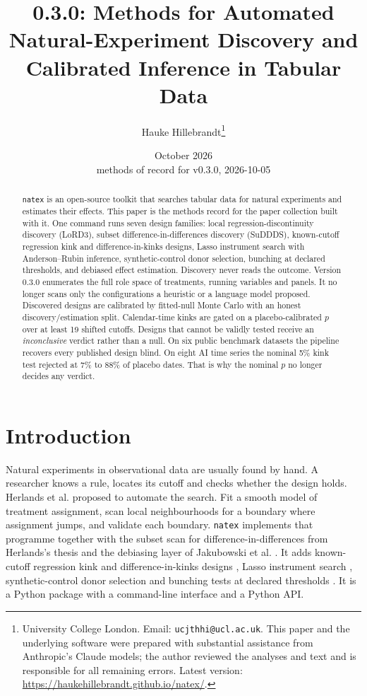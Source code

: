 \documentclass[11pt]{article}
\title{\natex{} 0.3.0: Methods for Automated Natural-Experiment Discovery and
Calibrated Inference in Tabular Data}
\author{Hauke Hillebrandt\thanks{University College London. Email:
\texttt{ucjthhi@ucl.ac.uk}. This paper and the underlying \natex{} software were
prepared with substantial assistance from Anthropic's Claude models; the author
reviewed the analyses and text and is responsible for all remaining errors.
Latest version: \url{https://haukehillebrandt.github.io/natex/}.}}
\date{October 2026 \\ \small methods of record for \natex{} v0.3.0, 2026-10-05}
\newcommand{\natex}{\texttt{natex}}
\begin{document}
\maketitle

\begin{abstract}
\noindent \natex{} is an open-source toolkit that searches tabular data for natural
experiments and estimates their effects. This paper is the methods record for the paper
collection built with it. One command runs seven design families: local
regression-discontinuity discovery (LoRD3), subset difference-in-differences discovery
(SuDDDS), known-cutoff regression kink and difference-in-kinks designs, Lasso instrument
search with Anderson--Rubin inference, synthetic-control donor selection, bunching at
declared thresholds, and debiased effect estimation. Discovery never reads the outcome.
Version 0.3.0 enumerates the full role space of treatments, running variables and panels.
It no longer scans only the configurations a heuristic or a language model proposed.
Discovered designs are calibrated by fitted-null Monte Carlo with an honest
discovery/estimation split. Calendar-time kinks are gated on a placebo-calibrated $p$
over at least 19 shifted cutoffs. Designs that cannot be validly tested receive an
\emph{inconclusive} verdict rather than a null. On six public benchmark datasets the
pipeline recovers every published design blind. On eight AI time series the nominal 5\% kink test rejected at 7\% to 88\% of placebo
dates. That is why the nominal $p$ no longer decides any verdict.
\end{abstract}

\section{Introduction}\label{sec:intro}

Natural experiments in observational data are usually found by hand. A researcher knows
a rule, locates its cutoff and checks whether the design holds. Herlands et al.
\cite{herlands2018} proposed to automate the search. Fit a smooth model of treatment
assignment, scan local neighbourhoods for a boundary where assignment jumps, and validate
each boundary. \natex{} \cite{natex} implements that programme together with the subset
scan for difference-in-differences from Herlands's thesis \cite{herlands2020} and the
debiasing layer of Jakubowski et al. \cite{jakubowski2023}. It adds known-cutoff
regression kink and difference-in-kinks designs \cite{card2015,bockerman2025}, Lasso
instrument search \cite{belloni2012}, synthetic-control donor selection
\cite{abadie2010} and bunching tests at declared thresholds \cite{kleven2016}. It is a
Python package with a command-line interface and a Python API.
\end{document}
